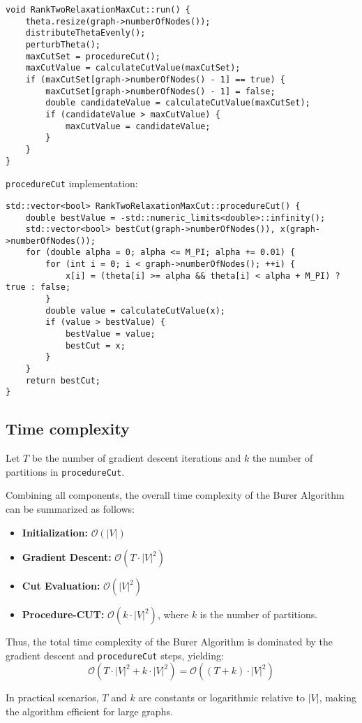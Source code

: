 \begin{verbatim}
void RankTwoRelaxationMaxCut::run() {
    theta.resize(graph->numberOfNodes());
    distributeThetaEvenly();
    perturbTheta();
    maxCutSet = procedureCut();
    maxCutValue = calculateCutValue(maxCutSet);
    if (maxCutSet[graph->numberOfNodes() - 1] == true) {
        maxCutSet[graph->numberOfNodes() - 1] = false;
        double candidateValue = calculateCutValue(maxCutSet);
        if (candidateValue > maxCutValue) {
            maxCutValue = candidateValue;
        }
    }
}
\end{verbatim}

\texttt{procedureCut} implementation:

\begin{verbatim}
std::vector<bool> RankTwoRelaxationMaxCut::procedureCut() {
    double bestValue = -std::numeric_limits<double>::infinity();
    std::vector<bool> bestCut(graph->numberOfNodes()), x(graph->numberOfNodes());
    for (double alpha = 0; alpha <= M_PI; alpha += 0.01) {
        for (int i = 0; i < graph->numberOfNodes(); ++i) {
            x[i] = (theta[i] >= alpha && theta[i] < alpha + M_PI) ? true : false;
        }
        double value = calculateCutValue(x);
        if (value > bestValue) {
            bestValue = value;
            bestCut = x;
        }
    }
    return bestCut;
}
\end{verbatim}

\subsection{Time complexity}

Let \( T \) be the number of gradient descent iterations and \( k \) the number of partitions in \texttt{procedureCut}.

Combining all components, the overall time complexity of the Burer Algorithm can be summarized as follows:

\begin{itemize}
    \item \textbf{Initialization:} \(\mathcal{O}(|V|)\)
    \item \textbf{Gradient Descent:} \(\mathcal{O}(T \cdot |V|^2)\)
    \item \textbf{Cut Evaluation:} \(\mathcal{O}(|V|^2)\)
    \item \textbf{Procedure-CUT:} \(\mathcal{O}(k \cdot |V|^2)\), where \(k\) is the number of partitions.
\end{itemize}

Thus, the total time complexity of the Burer Algorithm is dominated by the gradient descent and \texttt{procedureCut} steps, yielding:
\[
\mathcal{O}(T \cdot |V|^2 + k \cdot |V|^2) = \mathcal{O}((T + k) \cdot |V|^2)
\]

In practical scenarios, \(T\) and \(k\) are constants or logarithmic relative to \(|V|\), making the algorithm efficient for large graphs.